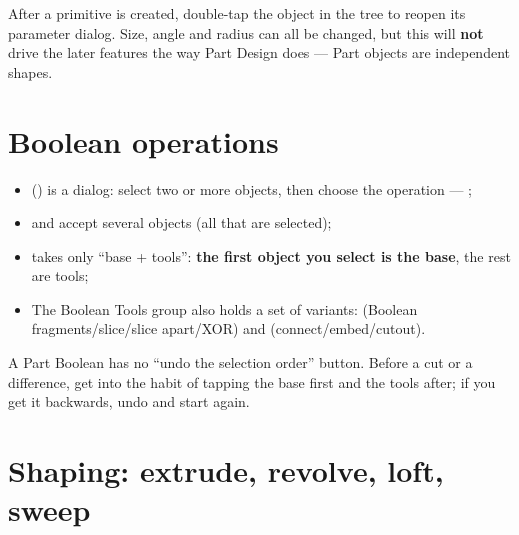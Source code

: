 \begin{tip}
After a primitive is created, double-tap the object in the tree to reopen its parameter dialog. Size, angle and radius
can all be changed, but this will \textbf{not} drive the later features the way Part Design does --- Part objects are
independent shapes.
\end{tip}

\section{Boolean operations}

\begin{itemize}
  \item {} () is a dialog: select two or more objects, then choose the operation ---
        ;
  \item {} and  accept several objects (all that are selected);
  \item {} takes only ``base + tools'': \textbf{the first object you select is the base}, the rest are tools;
  \item The Boolean Tools group also holds a set of variants:  (Boolean fragments/slice/slice apart/XOR)
        and  (connect/embed/cutout).
\end{itemize}

\begin{warn}
A Part Boolean has no ``undo the selection order'' button. Before a cut or a difference, get into the habit of tapping
the base first and the tools after; if you get it backwards, undo and start again.
\end{warn}

\section{Shaping: extrude, revolve, loft, sweep}

